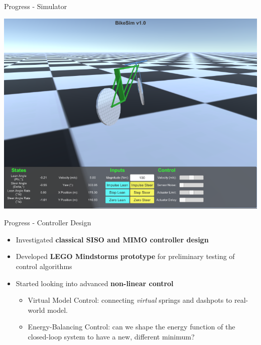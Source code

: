 \documentclass{beamer}
\begin{document}
\begin{frame}{Progress - Simulator}

  \centering
  \includegraphics[scale=0.475]{BikeSim}

\end{frame}

\begin{frame}{Progress - Controller Design}
 
  \begin{itemize}
  
  	\setlength\itemsep{0.5em}
 
  	\item {Investigated \textbf{classical SISO and MIMO controller design}}

	\item{Developed \textbf{LEGO Mindstorms prototype} for preliminary testing of control algorithms}
	
  	\item{Started looking into advanced \textbf{non-linear control}}
  	
  	\begin{itemize}
  		\item{Virtual Model Control: connecting \textit{virtual} springs and dashpots to real-world model.}
  		\item{Energy-Balancing Control: can we shape the energy function of the closed-loop system to have a new, different minimum?}
  	\end{itemize}
  
  \end{itemize}
    
\end{frame}
\end{document}
